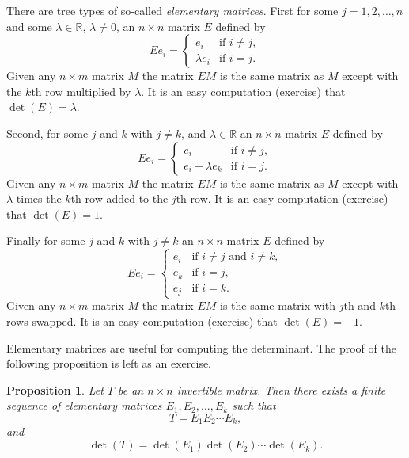 \documentclass[12pt]{book}
\newcommand{\R}{{\mathbb{R}}}
\theoremstyle{plain}
\newtheorem{prop}[thm]{Proposition}
\theoremstyle{remark}
\theoremstyle{definition}
\theoremstyle{exercise}
\theoremstyle{example}
\begin{document}
There are tree types of so-called
\emph{elementary matrices}.  First for some $j =
1,2,\ldots,n$ and
some $\lambda \in \R$, $\lambda \neq 0$, an
$n \times n$ matrix $E$ defined by
\begin{equation*}
Ee_i = 
\begin{cases}
e_i & \text{if $i \neq j$} , \\
\lambda e_i & \text{if $i = j$} .
\end{cases}
\end{equation*}
Given any $n \times m$ matrix $M$ the matrix $EM$ is the same matrix as $M$
except with the $k$th row multiplied by $\lambda$.
It is an easy computation (exercise) that $\det(E) = \lambda$.

Second, for some $j$ and $k$ with $j\neq k$, and $\lambda \in \R$ an
$n \times n$ matrix $E$ defined by
\begin{equation*}
Ee_i = 
\begin{cases}
e_i & \text{if $i \neq j$} , \\
e_i + \lambda e_k & \text{if $i = j$} .
\end{cases}
\end{equation*}
Given any $n \times m$ matrix $M$ the matrix $EM$ is the same matrix as $M$
except with $\lambda$ times the $k$th row added to the $j$th row.
It is an easy computation (exercise) that $\det(E) = 1$.

Finally for some $j$ and $k$ with $j\neq k$ an
$n \times n$ matrix $E$ defined by
\begin{equation*}
Ee_i = 
\begin{cases}
e_i & \text{if $i \neq j$ and $i \neq k$} , \\
e_k & \text{if $i = j$} , \\
e_j & \text{if $i = k$} .
\end{cases}
\end{equation*}
Given any $n \times m$ matrix $M$ the matrix $EM$ is the same matrix with
$j$th and $k$th rows swapped.
It is an easy computation (exercise) that $\det(E) = -1$.

Elementary matrices are useful for computing the determinant.
The proof of the following proposition is left as an exercise.

\begin{prop} \label{prop:elemmatrixdecomp}
Let $T$ be an $n \times n$ invertible matrix.  Then there exists a finite
sequence of elementary matrices $E_1, E_2, \ldots, E_k$ such that
\begin{equation*}
T = E_1 E_2 \cdots E_k ,
\end{equation*}
and
\begin{equation*}
\det(T) = \det(E_1)\det(E_2)\cdots \det(E_k) .
\end{equation*}
\end{prop}
\end{document}
